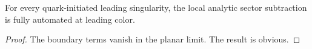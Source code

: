\begin{corollary}\label{thm:1}
For every quark-initiated leading singularity, the local analytic sector
subtraction is fully automated at leading color.
\end{corollary}

\begin{proof}
The boundary terms vanish in the planar limit. The result is obvious.
\end{proof}

